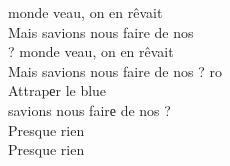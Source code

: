  monde veau, on en rêvait  \\
Mais  savions nous faire de nos \\
 ? monde veau, on en rêvait  \\
Mais  savions nous faire de nos  ? ro \\
Attrapеr le blue \\
 savions nous fairе de nos  ? \\
Pres\songwordfb{}que rien \\
Pres\songwordfb{}que rien \songwordfb{}